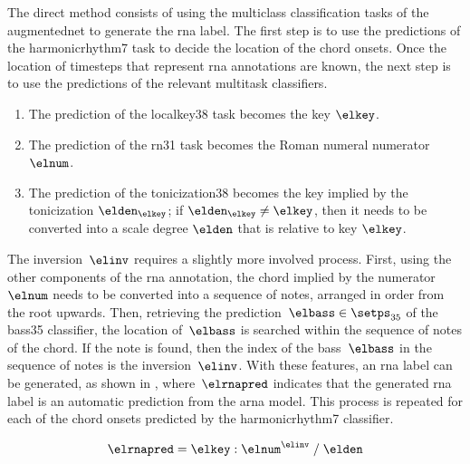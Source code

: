 

The direct method consists of using the multiclass
classification tasks of the \gls{augmentednet} to generate
the \gls{rna} label. The first step is to use the
predictions of the \gls{harmonicrhythm7} task to decide the
location of the chord onsets. Once the location of timesteps
that represent \gls{rna} annotations are known, the next
step is to use the predictions of the relevant multitask
classifiers.

\begin{enumerate}
    \item[] The prediction of the \gls{localkey38} task
    becomes the key $\elkey$.
    \item[] The prediction of the \gls{rn31} task becomes
    the Roman numeral numerator $\elnum$.
    \item[] The prediction of the \gls{tonicization38}
    becomes the key implied by the tonicization
    $\elden_\elkey$; if $\elden_\elkey \neq \elkey$, then it
    needs to be converted into a scale degree $\elden$ that
    is relative to key $\elkey$.
\end{enumerate}

The inversion~$\elinv$ requires a slightly more involved
process. First, using the other components of the \gls{rna}
annotation, the chord implied by the numerator~$\elnum$
needs to be converted into a sequence of notes, arranged in
order from the root upwards. Then, retrieving the
prediction~$\elbass \in \setps_{35}$ of the \gls{bass35}
classifier, the location of~$\elbass$ is searched within the
sequence of notes of the chord. If the note is found, then
the index of the bass~$\elbass$ in the sequence of notes is
the inversion~$\elinv$. With these features, an \gls{rna}
label can be generated, as shown in ,
where~$\elrnapred$ indicates that the generated \gls{rna}
label is an automatic prediction from the \gls{arna} model.
This process is repeated for each of the chord onsets
predicted by the \gls{harmonicrhythm7} classifier.

\begin{equation}
    \label{eq:rna_direct}
    \elrnapred = \elkey : \elnum^{\elinv} \; / \; \elden
\end{equation}



